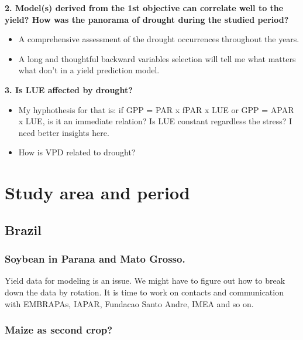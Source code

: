 \documentclass[a4paper,12pt,single,pdftex]{scrartcl}
\begin{document}
  
    
      {\bf 2. Model(s) derived from the 1st objective can correlate well to the yield? How was the panorama of drought during the studied period?}
    \\

    \begin{itemize}
  \item 
        A comprehensive assessment of the drought occurrences throughout the years.
      \item 
        A long and thoughtful backward variables selection will tell me what matters what don't in a yield prediction model.
      
    \end{itemize}
  
  
    
      {\bf 3. Is LUE affected by drought?}
    \\

    \begin{itemize}
  \item 
        
          My hyphothesis for that is: if GPP = PAR x fPAR x LUE or GPP = APAR x LUE, is it an immediate relation? Is LUE constant regardless the stress? I need better insights here.
        \\

      \item 
        
          How is VPD related to drought?
        \\

      
    \end{itemize}
  
  \section{Study area and period}
\subsection{Brazil}
\subsubsection{Soybean in Parana and Mato Grosso.}


Yield data for modeling is an issue.
We might have to figure out how to break down the data by rotation.
It is time to work on contacts and communication with EMBRAPAs, IAPAR, Fundacao Santo Andre, IMEA and so on.\subsubsection{Maize as second crop?}
\end{document}
